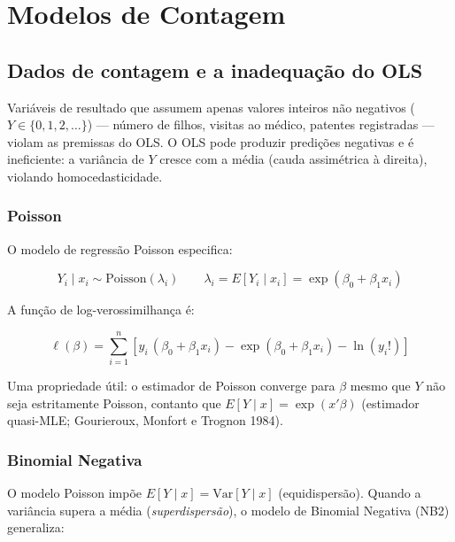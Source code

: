\chapter{Modelos de Contagem}
\label{cap:contagem}

\section{Dados de contagem e a inadequação do OLS}

Variáveis de resultado que assumem apenas valores inteiros não negativos
($Y \in \{0,1,2,\ldots\}$) — número de filhos, visitas ao médico, patentes
registradas — violam as premissas do OLS. O OLS pode produzir predições
negativas e é ineficiente: a variância de $Y$ cresce com a média (cauda
assimétrica à direita), violando homocedasticidade.

\subsection*{Poisson}

O modelo de regressão Poisson especifica:

\[
  Y_i \mid x_i \sim \mathrm{Poisson}(\lambda_i)
  \qquad
  \lambda_i = E[Y_i \mid x_i] = \exp(\beta_0 + \beta_1 x_i)
\]

A função de log-verossimilhança é:

\[
  \ell(\beta) = \sum_{i=1}^n \left[ y_i\,(\beta_0 + \beta_1 x_i) - \exp(\beta_0 + \beta_1 x_i) - \ln(y_i!) \right]
\]

Uma propriedade útil: o estimador de Poisson converge para $\beta$ mesmo que
$Y$ não seja estritamente Poisson, contanto que $E[Y\mid x] = \exp(x'\beta)$
(estimador quasi-MLE; Gourieroux, Monfort e Trognon 1984).

\subsection*{Binomial Negativa}

O modelo Poisson impõe $E[Y\mid x] = \mathrm{Var}[Y\mid x]$ (equidispersão).
Quando a variância supera a média (\emph{superdispersão}), o modelo de
Binomial Negativa (NB2) generaliza:


